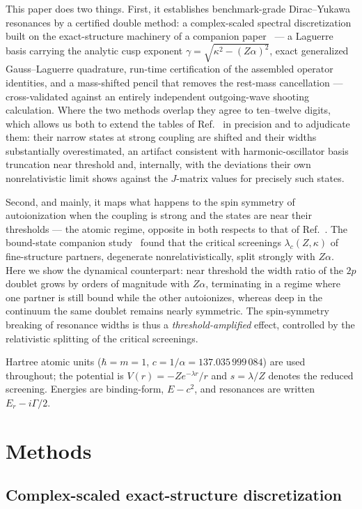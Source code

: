 \documentclass[aps,pra,twocolumn,superscriptaddress,floatfix,longbibliography]{revtex4-2}
\newcommand{\Za}{\ensuremath{Z\alpha}}
\begin{document}
This paper does two things. First, it establishes benchmark-grade
Dirac--Yukawa resonances by a certified double method: a complex-scaled
spectral discretization built on the exact-structure machinery of a
companion paper~\cite{companionA} --- a Laguerre basis carrying the
analytic cusp exponent $\gamma=\sqrt{\kappa^{2}-(\Za)^{2}}$, exact
generalized Gauss--Laguerre quadrature, run-time certification of the
assembled operator identities, and a mass-shifted pencil that removes
the rest-mass cancellation --- cross-validated against an entirely
independent outgoing-wave shooting calculation. Where the two methods
overlap they agree to ten--twelve digits, which allows us both to
extend the tables of Ref.~\cite{Shi2014} in precision and to adjudicate
them: their narrow states at strong coupling are shifted and their
widths substantially overestimated, an artifact consistent with
harmonic-oscillator basis truncation near threshold and, internally,
with the deviations their own nonrelativistic limit shows against the
$J$-matrix values for precisely such states.

Second, and mainly, it maps what happens to the spin symmetry of
autoionization when the coupling is strong and the states are near
their thresholds --- the atomic regime, opposite in both respects to
that of Ref.~\cite{Shi2014}. The bound-state companion
study~\cite{companionA} found that the critical screenings
$\lambda_{c}(Z,\kappa)$ of fine-structure partners, degenerate
nonrelativistically, split strongly with $\Za$. Here we show the
dynamical counterpart: near threshold the width ratio of the $2p$
doublet grows by orders of magnitude with $\Za$, terminating in a
regime where one partner is still bound while the other autoionizes,
whereas deep in the continuum the same doublet remains nearly
symmetric. The spin-symmetry breaking of resonance widths is thus a
\emph{threshold-amplified} effect, controlled by the relativistic
splitting of the critical screenings.

Hartree atomic units ($\hbar=m=1$, $c=1/\alpha=137.035\,999\,084$) are
used throughout; the potential is $V(r)=-Z e^{-\lambda r}/r$ and
$s=\lambda/Z$ denotes the reduced screening. Energies are binding-form,
$E-c^{2}$, and resonances are written $E_{r}-i\Gamma/2$.

\section{Methods}
\label{sec:methods}

\subsection{Complex-scaled exact-structure discretization}
\end{document}
